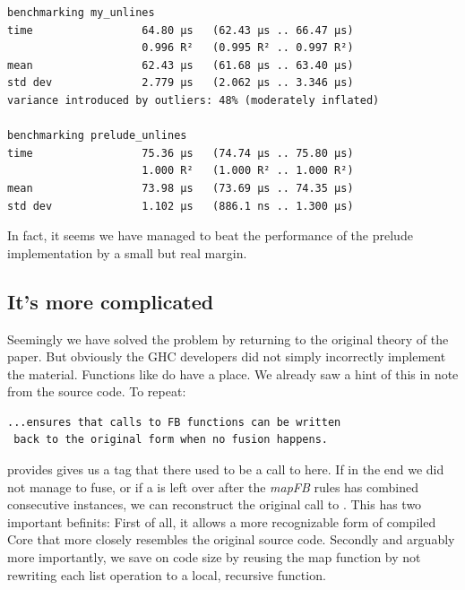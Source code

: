 \begin{listing}[H]
\begin{verbatim}
benchmarking my_unlines
time                 64.80 μs   (62.43 μs .. 66.47 μs)
                     0.996 R²   (0.995 R² .. 0.997 R²)
mean                 62.43 μs   (61.68 μs .. 63.40 μs)
std dev              2.779 μs   (2.062 μs .. 3.346 μs)
variance introduced by outliers: 48% (moderately inflated)

benchmarking prelude_unlines
time                 75.36 μs   (74.74 μs .. 75.80 μs)
                     1.000 R²   (1.000 R² .. 1.000 R²)
mean                 73.98 μs   (73.69 μs .. 74.35 μs)
std dev              1.102 μs   (886.1 ns .. 1.300 μs)
\end{verbatim}
\end{listing}

In fact, it seems we have managed to beat the performance of the prelude implementation by a small but real margin.

\subsection{It's more complicated}
\label{section:results:unlines:conclusion}

Seemingly we have solved the problem by returning to the original theory of the paper. But obviously the GHC developers did not simply
incorrectly implement the material. Functions like  do have a place. We already saw a hint of this in note from the source
code. To repeat:

\begin{listing}[H]
\begin{verbatim}
...ensures that calls to FB functions can be written
 back to the original form when no fusion happens.
\end{verbatim}
\end{listing}

 provides gives us a tag that there used to be a call to  here. If in the end we did not manage to fuse,
or if a  is left over after the \textit{mapFB} rules has combined consecutive instances, we can reconstruct the original
call to . This has two important befinits: First of all, it allows a more recognizable form of compiled Core that more closely
resembles the original source code. Secondly and arguably more importantly, we save on code size by reusing the map function by not
rewriting each list operation to a local, recursive  function.

